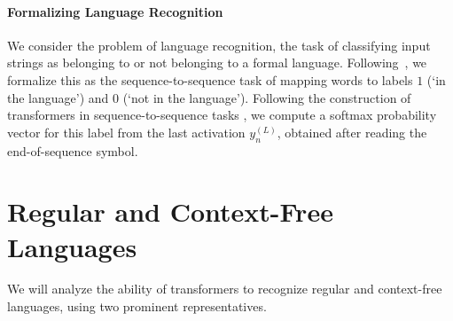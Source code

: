 \documentclass[11pt,a4paper]{article}
\begin{document}
\paragraph{Formalizing Language Recognition}
We consider the problem of language recognition, the task of classifying input strings as belonging to or not belonging to a formal language.
Following~\citet{weiss2018practical}, we formalize this as the sequence-to-sequence task of mapping words to labels $1$ (`in the language') and $0$ (`not in the language').
Following the construction of transformers in sequence-to-sequence tasks \cite{vaswani2017attention}, we compute a softmax probability vector for this label from the last activation $y_{n}^{(L)}$, obtained after reading the end-of-sequence symbol.







\section{Regular and Context-Free Languages}\label{sec:langs} %

We will analyze the ability of transformers to recognize regular and context-free languages, using two prominent representatives. %
\end{document}
